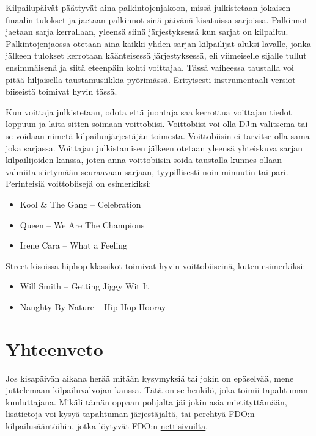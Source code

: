 \documentclass[12pt, a4paper, oneside]{article}
\begin{document}
Kilpailupäivät päättyvät aina palkintojenjakoon,
missä julkistetaan jokaisen finaalin tulokset ja jaetaan palkinnot sinä päivänä kisatuissa sarjoissa.
Palkinnot jaetaan sarja kerrallaan,
yleensä siinä järjestyksessä kun sarjat on kilpailtu.
Palkintojenjaossa otetaan aina kaikki yhden sarjan kilpailijat aluksi lavalle,
jonka jälkeen tulokset kerrotaan käänteisessä järjestyksessä,
eli viimeiselle sijalle tullut ensimmäisenä ja siitä eteenpäin kohti voittajaa.
Tässä vaiheessa taustalla voi pitää hiljaisella taustamusiikkia pyörimässä.
Erityisesti instrumentaali-versiot biiseistä toimivat hyvin tässä.

Kun voittaja julkistetaan,
odota että juontaja saa kerrottua voittajan tiedot loppuun ja laita sitten soimaan voittobiisi.
Voittobiisi voi olla DJ:n valitsema tai se voidaan nimetä kilpailunjärjestäjän toimesta.
Voittobiisin ei tarvitse olla sama joka sarjassa.
Voittajan julkistamisen jälkeen otetaan yleensä yhteiskuva sarjan kilpailijoiden kanssa,
joten anna voittobiisin soida taustalla kunnes ollaan valmiita siirtymään seuraavaan sarjaan,
tyypillisesti noin minuutin tai pari.
Perinteisiä voittobiisejä on esimerkiksi:
\begin{itemize}[nosep]
    \item Kool \& The Gang -- Celebration
    \item Queen -- We Are The Champions
    \item Irene Cara -- What a Feeling
\end{itemize}

Street-kisoissa hiphop-klassikot toimivat hyvin voittobiiseinä,
kuten esimerkiksi:
\begin{itemize}[nosep]
    \item Will Smith -- Getting Jiggy Wit It
    \item Naughty By Nature -- Hip Hop Hooray
\end{itemize}

\section{Yhteenveto} \label{sec:yhteenveto}

Jos kisapäivän aikana herää mitään kysymyksiä tai jokin on epäselvää,
mene juttelemaan kilpailuvalvojan kanssa.
Tätä on se henkilö,
joka toimii tapahtuman kuuluttajana.
Mikäli tämän oppaan pohjalta jäi jokin asia mietityttämään,
lisätietoja voi kysyä tapahtuman järjestäjältä,
tai perehtyä FDO:n kilpailusääntöihin,
jotka löytyvät FDO:n \href{https://fdo.fi/kilpailut/}{nettisivuilta}.
\end{document}
